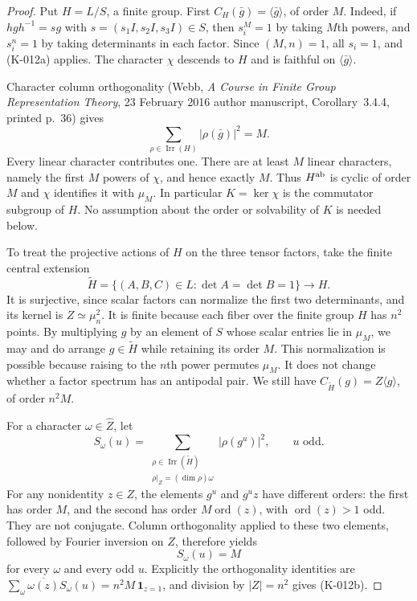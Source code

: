 \begin{proof}
Put $H=L/S$, a finite group.  First
$C_H(\bar g)=\langle\bar g\rangle$, of order $M$.
Indeed, if $hgh^{-1}=sg$ with $s=(s_1I,s_2I,s_3I)\in S$, then
$s_i^M=1$ by taking $M$th powers, and $s_i^n=1$ by taking determinants
in each factor.  Since $(M,n)=1$, all $s_i=1$, and (K-012a) applies.
The character $\chi$ descends to $H$ and is faithful on
$\langle\bar g\rangle$.

Character column orthogonality (Webb, \emph{A Course in Finite Group
Representation Theory}, 23 February 2016 author manuscript,
Corollary~3.4.4, printed p.~36) gives
\[
             \sum_{\rho\in\operatorname{Irr}(H)}
                    |\rho(\bar g)|^2=M.
\]
Every linear character contributes one.  There are at least $M$ linear
characters, namely the first $M$ powers of $\chi$, and hence exactly $M$.
Thus $H^{\rm ab}$ is cyclic of order $M$ and $\chi$ identifies it with
$\mu_M$.  In particular $K=\ker\chi$ is the commutator subgroup of $H$.
No assumption about the order or solvability of $K$ is needed below.

To treat the projective actions of $H$ on the three tensor factors,
take the finite central extension
\[
 \widetilde H=\{(A,B,C)\in L:\det A=\det B=1\}
       \longrightarrow H.
\]
It is surjective, since scalar factors can normalize the first two
determinants, and its kernel is $Z\simeq\mu_n^2$.  It is finite because
each fiber over the finite group $H$ has $n^2$ points.  By multiplying
$g$ by an element of $S$ whose scalar entries lie in $\mu_M$, we may
and do arrange $g\in\widetilde H$ while retaining its order $M$.
This normalization is possible because raising to the $n$th power
permutes $\mu_M$.  It does not change whether a factor spectrum has
an antipodal pair.  We still have
$C_{\widetilde H}(g)=Z\langle g\rangle$, of order $n^2M$.

For a character $\omega\in\widehat Z$, let
\[
 S_\omega(u)=
 \sum_{\substack{\rho\in\operatorname{Irr}(\widetilde H)\\
                  \rho|_Z=(\dim\rho)\omega}}
                         |\rho(g^u)|^2,
 \qquad u\text{ odd}.
\]
For any nonidentity $z\in Z$, the elements $g^u$ and $g^uz$ have
different orders: the first has order $M$, and the second has order
$M\operatorname{ord}(z)$, with $\operatorname{ord}(z)>1$ odd.
They are not conjugate.  Column orthogonality applied to these two
elements, followed by Fourier inversion on $Z$, therefore yields
\[
                         S_\omega(u)=M                     \tag{K-012b}
\]
for every $\omega$ and every odd $u$.  Explicitly the orthogonality
identities are
$\sum_\omega\overline{\omega(z)}S_\omega(u)
=n^2M\,\mathbf1_{z=1}$, and division by $|Z|=n^2$ gives (K-012b).


\end{proof}
